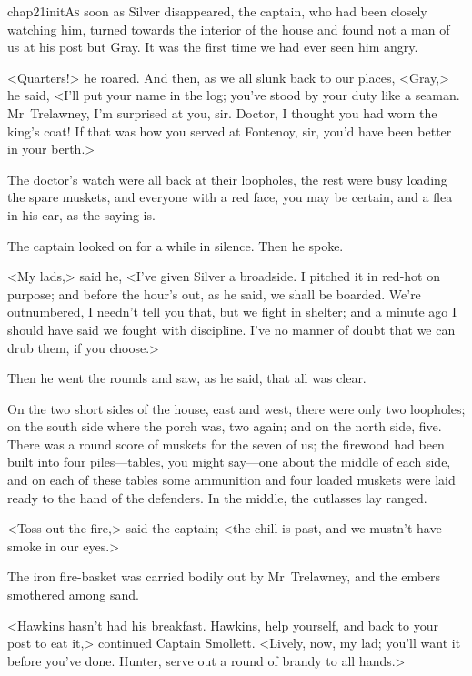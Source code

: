 
\lettrine{chap21initA}{s} soon as Silver disappeared, the captain, who had been closely watching him, turned towards the interior of the house and found not a man of us at his post but Gray. It was the first time we had ever seen him angry.

\zz
<Quarters!> he roared. And then, as we all slunk back to our places, <Gray,> he said, <I'll put your name in the log; you've stood by your duty like a seaman. Mr~Trelawney, I'm surprised at you, sir. Doctor, I thought you had worn the king's coat! If that was how you served at Fontenoy, sir, you'd have been better in your berth.>

The doctor's watch were all back at their loopholes, the rest were busy loading the spare muskets, and everyone with a red face, you may be certain, and a flea in his ear, as the saying is.

The captain looked on for a while in silence. Then he spoke.

<My lads,> said he, <I've given Silver a broadside. I pitched it in red-hot on purpose; and before the hour's out, as he said, we shall be boarded. We're outnumbered, I needn't tell you that, but we fight in shelter; and a minute ago I should have said we fought with discipline. I've no manner of doubt that we can drub them, if you choose.>

Then he went the rounds and saw, as he said, that all was clear.

On the two short sides of the house, east and west, there were only two loopholes; on the south side where the porch was, two again; and on the north side, five. There was a round score of muskets for the seven of us; the firewood had been built into four piles—tables, you might say—one about the middle of each side, and on each of these tables some ammunition and four loaded muskets were laid ready to the hand of the defenders. In the middle, the cutlasses lay ranged.

<Toss out the fire,> said the captain; <the chill is past, and we mustn't have smoke in our eyes.>

The iron fire-basket was carried bodily out by Mr~Trelawney, and the embers smothered among sand.

<Hawkins hasn't had his breakfast. Hawkins, help yourself, and back to your post to eat it,> continued Captain Smollett. <Lively, now, my lad; you'll want it before you've done. Hunter, serve out a round of brandy to all hands.>

